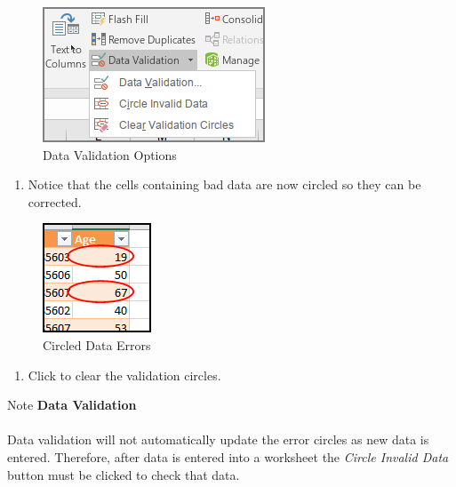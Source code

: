 \begin{figure}[H]
	\centering
	\includegraphics[width=\maxwidth{.50\linewidth}]{gfx/ch07_fig42}
	\caption{Data Validation Options}
	\label{07:fig42}
\end{figure}

\begin{enumerate}[resume]	
	\item Notice that the cells containing bad data are now circled so they can be corrected.
\end{enumerate}

\begin{figure}[H]
	\centering
	\includegraphics[width=\maxwidth{.95\linewidth}]{gfx/ch07_fig43}
	\caption{Circled Data Errors}
	\label{07:fig43}
\end{figure}

\begin{enumerate}[resume]	
	\item Click  to clear the validation circles.
\end{enumerate}

\begin{center}
	\begin{infobox}{Note}
		\textbf{Data Validation}
		\\
		\\
		Data validation will not automatically update the error circles as new data is entered. Therefore, after data is entered into a worksheet the \textit{Circle Invalid Data} button must be clicked to check that data.
	\end{infobox}
\end{center}

